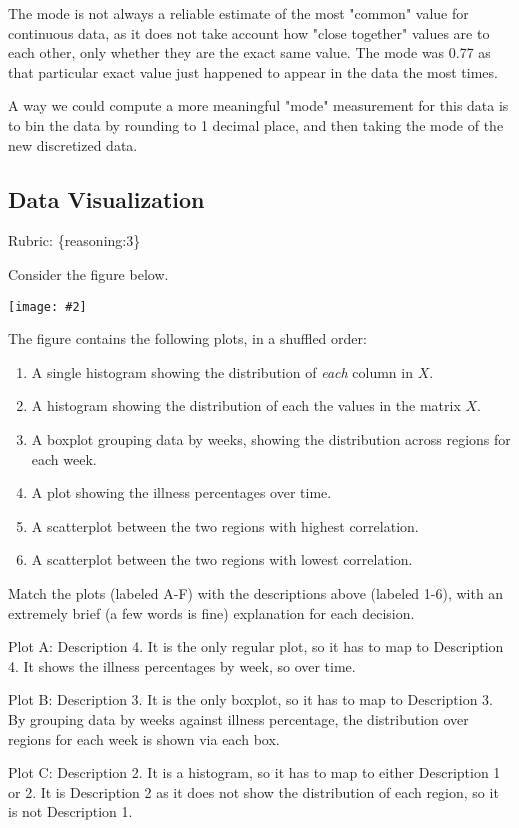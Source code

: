 \documentclass{article}
\def\rubric#1{\gre{Rubric: \{#1\}}}{}
\def\blu#1{{\color{blu}#1}}
\def\gre#1{{\color{gre}#1}}
\newcommand{\fig}[2]{\texttt{[image: \#2]}}
\def\enum#1{\begin{enumerate}#1\end{enumerate}}
\begin{document}
\gre{The mode is not always a reliable estimate of the most "common" value for continuous data, as it does not take account how "close together" values are to each other, only whether they are the exact same value. The mode was 0.77 as that particular exact value just happened to appear in the data the most times.}

\gre{A way we could compute a more meaningful "mode" measurement for this data is to bin the data by rounding to 1 decimal place, and then taking the mode of the new discretized data.}

\subsection{Data Visualization}
\rubric{reasoning:3}

Consider the figure below.

\fig{1}{../figs/visualize-unlabeled}

The figure contains the following plots, in a shuffled order:
\enum{
\item A single histogram showing the distribution of \emph{each} column in $X$.
\item A histogram showing the distribution of each the values in the matrix $X$.
\item A boxplot grouping data by weeks, showing the distribution across regions for each week.
\item A plot showing the illness percentages over time.
\item A scatterplot between the two regions with highest correlation.
\item A scatterplot between the two regions with lowest correlation.
}

\blu{Match the plots (labeled A-F) with the descriptions above (labeled 1-6), with an extremely brief (a few words is fine) explanation for each decision.}

\gre{Plot A: Description 4. It is the only regular plot, so it has to map to Description 4. It shows the illness percentages by week, so over time.}

\gre{Plot B: Description 3. It is the only boxplot, so it has to map to Description 3. By grouping data by weeks against illness percentage, the distribution over 
regions for each week is shown via each box.}

\gre{Plot C: Description 2. It is a histogram, so it has to map to either Description 1 or 2. It is Description 2 as it does not show the distribution of each region, so it is not Description 1.}
\end{document}
